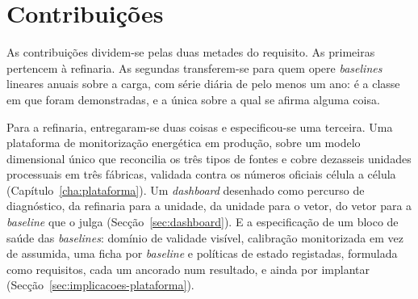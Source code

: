 


\section{Contribuições}
\label{sec:contribuicoes}

As contribuições dividem-se pelas duas metades do requisito. As
primeiras pertencem à refinaria. As segundas transferem-se para quem
opere \emph{baselines} lineares anuais sobre a carga, com série diária
de pelo menos um ano: é a classe em que foram demonstradas, e a única
sobre a qual se afirma alguma coisa.

Para a refinaria, entregaram-se duas coisas e especificou-se uma
terceira. Uma plataforma de monitorização energética em produção, sobre
um modelo dimensional único que reconcilia os três tipos de fontes e cobre
dezasseis unidades processuais em três fábricas, validada contra os números oficiais célula a célula
(Capítulo~\ref{cha:plataforma}). Um
\emph{dashboard} desenhado como percurso de diagnóstico, da refinaria
para a unidade, da unidade para o vetor, do vetor para a \emph{baseline}
que o julga (Secção~\ref{sec:dashboard}). E a especificação de um bloco
de saúde das \emph{baselines}: domínio de
validade visível, calibração monitorizada em vez de assumida, uma ficha
por \emph{baseline} e políticas de estado registadas, formulada como
requisitos, cada um ancorado num resultado, e ainda por implantar
(Secção~\ref{sec:implicacoes-plataforma}).


